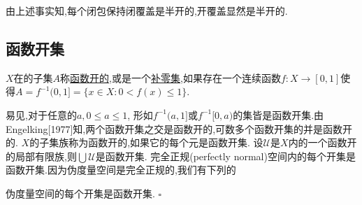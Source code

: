\documentclass[main.tex]{subfiles}
\begin{document}
由上述事实知,每个闭包保持闭覆盖是半开的,开覆盖显然是半开的.


\subsection{函数开集}\label{ch1.1.4}
\begin{definition}
	$X$在的子集$A$称\underline{函数开的},或是一个\underline{补零集},如果存在一个连续函数$f:X\rightarrow [0,1]$使得$A=f^{-1}(0,1]=\{x\in X: 0<f(x)\le 1\}$.
\end{definition}

易见,对于任意的$a, 0\le a\le1$, 形如$f^{-1}(a,1]$或$f^{-1}[0,a)$的集皆是函数开集.由 Engelking[1977]知,两个函数开集之交是函数开的,可数多个函数开集的并是函数开的.
$X$的子集族称为函数开的,如果它的每个元是函数开集.
设$\mathscr{U}$是$X$内的一个函数开的局部有限族,则$\bigcup \mathscr{U}$是函数开集.
完全正规(perfectly normal)空间内的每个开集是函数开集.因为伪度量空间是完全正规的,我们有下列的

\begin{fact}
伪度量空间的每个开集是函数开集. $\square$
\end{fact}
\end{document}
